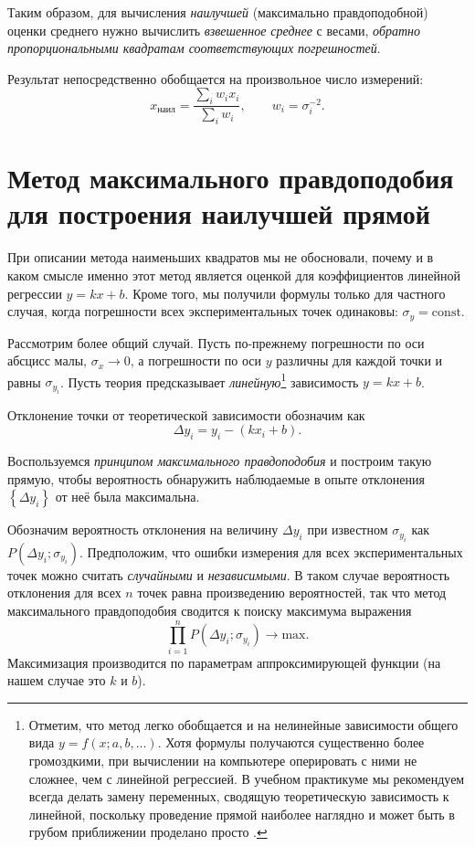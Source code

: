 Таким образом, для вычисления \emph{наилучшей} (максимально правдоподобной) оценки
среднего нужно вычислить \emph{взвешенное среднее} с весами, \emph{обратно
пропорциональными квадратам соответствующих погрешностей}.

Результат непосредственно обобщается на произвольное число измерений:
\begin{equation}
x_{\text{наил}}=\frac{\sum\limits _{i}w_{i}x_{i}}{\sum\limits _{i}w_{i}},\qquad w_{i}=\sigma_{i}^{-2}.
\end{equation}

\section{Метод максимального правдоподобия для построения наилучшей
прямой\label{subsec:MMP}}

При описании метода наименьших квадратов мы не обосновали,
почему и в каком смысле именно этот метод является 
оценкой для коэффициентов линейной регрессии $y=kx+b$. Кроме того,
мы получили формулы только для частного случая, когда погрешности
всех экспериментальных точек одинаковы: $\sigma_{y}=\mathrm{const}$.

Рассмотрим более общий случай. Пусть по-прежнему погрешности
по оси абсцисс малы, $\sigma_{x}\to0$, а погрешности по оси $y$
различны для каждой точки и равны $\sigma_{y_{i}}$. Пусть теория
предсказывает \emph{линейную}\footnote{Отметим, что метод легко обобщается и на нелинейные зависимости общего вида $y=f\left(x;a,b,\ldots\right)$. Хотя формулы
получаются существенно более громоздкими, при вычислении на компьютере
оперировать с ними не сложнее, чем с линейной регрессией. В учебном
практикуме мы рекомендуем всегда делать замену переменных, сводящую
теоретическую зависимость к линейной, поскольку проведение прямой
наиболее наглядно и может быть в грубом приближении проделано просто
.} 
зависимость $y=kx+b$.

Отклонение точки от теоретической зависимости обозначим как
\[
\Delta y_{i}=y_{i}-\left(kx_{i}+b\right).
\]

Воспользуемся \emph{принципом максимального правдоподобия}
и построим такую прямую, чтобы вероятность обнаружить наблюдаемые
в опыте отклонения $\left\{ \Delta y_{i}\right\} $ от неё была максимальна.

Обозначим вероятность отклонения на величину $\Delta y_{i}$
при известном $\sigma_{y_{i}}$ как $P\!\left(\Delta y_{i};\sigma_{y_{i}}\right)$.
Предположим, что ошибки измерения для всех экспериментальных точек
можно считать \emph{случайными} и \emph{независимыми}.
В таком случае вероятность отклонения для всех $n$ точек равна произведению
вероятностей, так что метод максимального правдоподобия сводится к
поиску максимума выражения
\begin{equation}
\prod\limits _{i=1}^{n}P\!\left(\Delta y_{i};\sigma_{y_{i}}\right)\to\mathrm{max}.\label{eq:MMP_general}
\end{equation}
Максимизация производится по параметрам аппроксимирующей функции (на
нашем случае это $k$ и $b$).

